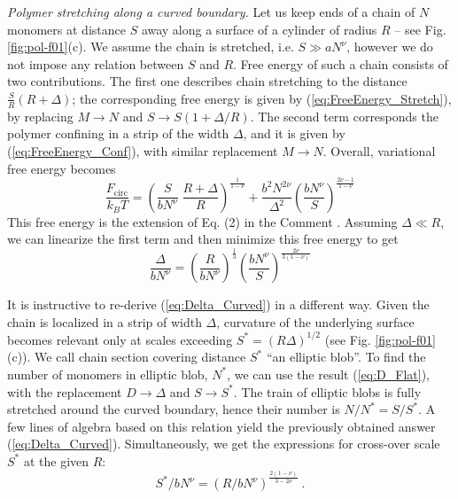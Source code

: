 \documentclass[aps,pre,floatfix,twocolumn,nofootinbib]{revtex4-2}
\newcommand{\be}{\begin{equation}}
\newcommand{\ee}{\end{equation}}
\newcommand{\eq}[1]{(\ref{#1})}
\begin{document}

\textit{Polymer stretching along a curved boundary.} Let us keep ends of a chain of $N$ monomers at distance $S$ away along a surface of a cylinder of radius $R$ -- see Fig. \ref{fig:pol-f01}(c). We assume the chain is stretched, i.e. $S \gg a N^{\nu}$, however we do not impose any relation between $S$ and $R$. Free energy of such a chain consists of two contributions. The first one describes chain stretching to the distance $\frac{S}{R} \left(R+\Delta \right)$; the corresponding free energy is given by \eq{eq:FreeEnergy_Stretch}, by replacing $M \to N$ and $S \to S \left(1 + \Delta/R \right)$. The second term corresponds the polymer confining in a strip of the width $\Delta$, and it is given by \eq{eq:FreeEnergy_Conf}, with similar replacement $M \to N$. Overall, variational free energy becomes
\be
\frac{F_{\mathrm{circ}}}{k_B T} =  \left(\frac{S}{b N^{\nu}}\; \frac{R+\Delta}{R} \right)^{\frac{1}{1-\nu}}  + \frac{b^2 N^{2\nu}}{\Delta^2} \left( \frac{b N^{\nu}}{S} \right)^{\frac{2 \nu -1}{1-\nu}}
\label{eq:free_energy_circle}
\ee
This free energy is the extension of Eq. (2) in the Comment \cite{Grosberg_Comment_2021}. Assuming $\Delta \ll R$, we can linearize the first term and then minimize this free energy to get
\be
\frac{\Delta}{bN^{\nu}} = \left( \frac{R}{bN^{\nu}} \right)^{\frac{1}{3}} \left( \frac{b N^{\nu}}{S} \right)^{\frac{2 \nu}{3(1-\nu)}}
\label{eq:Delta_Curved}
\ee

It is instructive to re-derive (\ref{eq:Delta_Curved}) in a different way. Given the chain is localized in a strip of width $\Delta$, curvature of the underlying surface becomes relevant only at scales exceeding $S^{\ast} = (R \Delta )^{1/2}$ (see Fig. \ref{fig:pol-f01}(c)).  We call chain section covering distance $S^{\ast}$ ``an elliptic blob''.  To find the number of monomers in elliptic blob,  $N^{\ast}$, we can use the result \eq{eq:D_Flat}, with the replacement $D \to \Delta$ and $S \to S^{\ast}$.  The train of elliptic blobs is fully stretched around the curved boundary, hence their number is $N/N^{\ast} = S/S^{\ast}$.  A few lines of algebra based on this relation yield the previously obtained answer (\ref{eq:Delta_Curved}). Simultaneously, we get the expressions for cross-over scale $S^{\ast}$ at the given $R$:
\be
S^{\ast}/b N^{\nu} = \left( R / b N^{\nu} \right)^{\frac{2(1-\nu)}{3-2\nu}}\ .
\label{eq:crossover}
\ee
\end{document}
